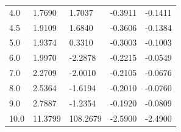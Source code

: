 \begin{table}[ht]
\begin{tabular}{ m{6em} m{6em}  m{6em}  m{6em} m{6em} }
        4.0 & 1.7690 & 1.7037 & -0.3911 & -0.1411 \\
        4.5 & 1.9109 & 1.6840 & -0.3606 & -0.1384 \\
        5.0 & 1.9374 & 0.3310 & -0.3003 & -0.1003 \\
        6.0 & 1.9970 & -2.2878 & -0.2215 & -0.0549 \\
        7.0 & 2.2709 & -2.0010 & -0.2105 & -0.0676 \\
        8.0 & 2.5364 & -1.6194 & -0.2010 & -0.0760 \\
        9.0 & 2.7887 & -1.2354 & -0.1920 & -0.0809 \\
        10.0 & 11.3799 & 108.2679 & -2.5900 & -2.4900 \\
		\hline
		\end{tabular}
        \end{table}

